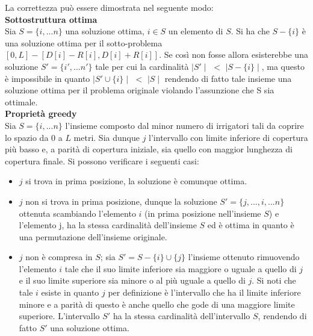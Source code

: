 \documentclass[../cheatSheetAlgoritmi.tex]{subfiles}
\begin{document}
La correttezza può essere dimostrata nel seguente modo: \\
\textbf{Sottostruttura ottima} \\
Sia $S = \{i, ... n\}$ una soluzione ottima, $i \in S$ un elemento di $S$. Si ha che $S - \{i\}$ è una soluzione ottima per il sotto-problema $[0, L] - [D[i] - R[i], D[i] + R[i]]$. Se così non fosse allora esisterebbe una soluzione $S' = \{i', ... n'\}$ tale per cui la cardinalità $\mid S' \mid$ $<$ $\mid S - \{i\} \mid$, ma questo è impossibile in quanto $\mid S' \cup \{i\} \mid$ $<$ $\mid S \mid$ rendendo di fatto tale insieme una soluzione ottima per il problema originale violando l'assunzione che S sia ottimale.\\
\textbf{Proprietà greedy} \\
Sia $S = \{i, ... n\}$ l'insieme composto dal minor numero di irrigatori tali da coprire lo spazio da 0 a $L$ metri. Sia dunque $j$ l'intervallo con limite inferiore di copertura più basso e, a parità di copertura iniziale, sia quello con maggior lunghezza di copertura finale. Si possono verificare i seguenti casi:
\begin{itemize}
    \item $j$ si trova in prima posizione, la soluzione è comunque ottima.
    \item $j$ non si trova in prima posizione, dunque la soluzione $S' = \{j, ..., i, ... n\}$ ottenuta scambiando l'elemento $i$ (in prima posizione nell'insieme $S$) e l'elemento j, ha la stessa cardinalità dell'insieme $S$ ed è ottima in quanto è una permutazione dell'insieme originale.
    \item $j$ non è compresa in $S$; sia $S' = S - \{i\} \cup \{j\}$ l'insieme ottenuto rimuovendo l'elemento $i$ tale che il suo limite inferiore sia maggiore o uguale a quello di $j$ e il suo limite superiore sia minore o al più uguale a quello di $j$. Si noti che tale $i$ esiste in quanto $j$ per definizione è l'intervallo che ha il limite inferiore minore e a parità di questo è anche quello che gode di una maggiore limite superiore. L'intervallo $S'$ ha la stessa cardinalità dell'intervallo $S$, rendendo di fatto $S'$ una soluzione ottima.
\end{itemize}
\newpage
\end{document}
